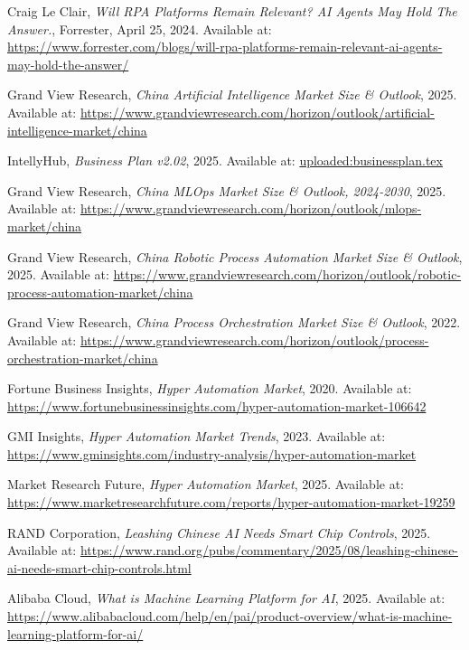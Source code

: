 \documentclass[11pt, a4paper, oneside]{article}
\begin{document}
\begin{thebibliography}{99}
    Craig Le Clair, \textit{Will RPA Platforms Remain Relevant? AI Agents May Hold The Answer.}, Forrester, April 25, 2024. Available at: \url{https://www.forrester.com/blogs/will-rpa-platforms-remain-relevant-ai-agents-may-hold-the-answer/}
    
    Grand View Research, \textit{China Artificial Intelligence Market Size \& Outlook}, 2025. Available at: \url{https://www.grandviewresearch.com/horizon/outlook/artificial-intelligence-market/china}

    IntellyHub, \textit{Business Plan v2.02}, 2025. Available at: \url{uploaded:businessplan.tex}

    Grand View Research, \textit{China MLOps Market Size \& Outlook, 2024-2030}, 2025. Available at: \url{https://www.grandviewresearch.com/horizon/outlook/mlops-market/china}

    Grand View Research, \textit{China Robotic Process Automation Market Size \& Outlook}, 2025. Available at: \url{https://www.grandviewresearch.com/horizon/outlook/robotic-process-automation-market/china}

    Grand View Research, \textit{China Process Orchestration Market Size \& Outlook}, 2022. Available at: \url{https://www.grandviewresearch.com/horizon/outlook/process-orchestration-market/china}

    Fortune Business Insights, \textit{Hyper Automation Market}, 2020. Available at: \url{https://www.fortunebusinessinsights.com/hyper-automation-market-106642}

    GMI Insights, \textit{Hyper Automation Market Trends}, 2023. Available at: \url{https://www.gminsights.com/industry-analysis/hyper-automation-market}

    Market Research Future, \textit{Hyper Automation Market}, 2025. Available at: \url{https://www.marketresearchfuture.com/reports/hyper-automation-market-19259}
    
    RAND Corporation, \textit{Leashing Chinese AI Needs Smart Chip Controls}, 2025. Available at: \url{https://www.rand.org/pubs/commentary/2025/08/leashing-chinese-ai-needs-smart-chip-controls.html}

    Alibaba Cloud, \textit{What is Machine Learning Platform for AI}, 2025. Available at: \url{https://www.alibabacloud.com/help/en/pai/product-overview/what-is-machine-learning-platform-for-ai/}


\end{thebibliography}
\end{document}
